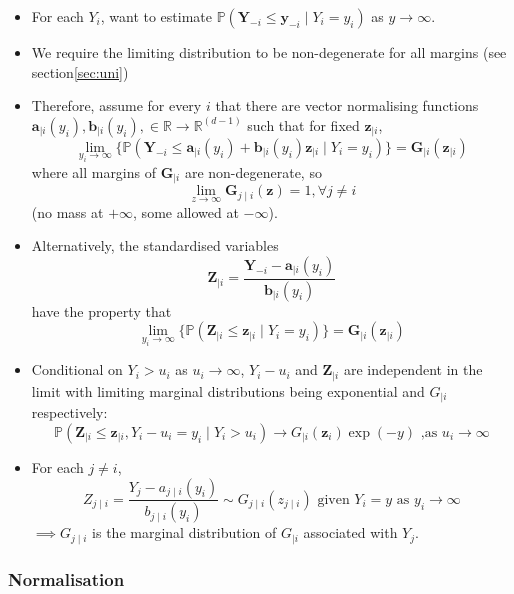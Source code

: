 \documentclass{article}
\numberwithin{equation}{section}
\begin{document}
\begin{itemize}
  \item For each $Y_i$, want to estimate $\mathbb{P}(\bm{Y}_{-i} \le \bm{y}_{-i} \mid Y_i = y_i)$ as $y \rightarrow \infty$. 
  \item We require the limiting distribution to be non-degenerate for all margins (see section\ref{sec:uni})
  \item Therefore, assume for every $i$ that there are vector normalising functions $\bm{a}_{\mid i}(y_i),\bm{b}_{\mid i}(y_i), \in \mathbb{R} \rightarrow \mathbb{R}^{(d-1)}$ such that for fixed $\bm{z}_{\mid i}$, 
    \[
      \lim_{y_i \rightarrow \infty}\{\mathbb{P}(\bm{Y}_{-i} \le \bm{a}_{\mid i}(y_i) + \bm{b}_{\mid i}(y_i)\bm{z}_{\mid i} \mid Y_i = y_i)\} = \bm{G}_{\mid i}(\bm{z}_{\mid i})
    \] 
    where all margins of $\bm{G}_{\mid i}$ are non-degenerate, so 
    \[
    \lim_{z \rightarrow \infty}{\bm{G}_{j \mid i}(\bm{z})} = 1, \forall j \ne i
    \] (no mass at $+\infty$, some allowed at $-\infty$).
  \item Alternatively, the standardised variables
    \[
      \bm{Z}_{\mid i} = \frac{\bm{Y}_{-i} - \bm{a}_{\mid i}(y_i)} {\bm{b}_{\mid i}(y_i)}
    \]
    have the property that 
    \[
      \lim_{y_i \rightarrow \infty}\{\mathbb{P}(\bm{Z}_{\mid i} \le \bm{z}_{\mid i} \mid Y_i = y_i)\} = \bm{G}_{\mid i}(\bm{z}_{\mid i})
    \]
  \item Conditional on $Y_i > u_i$ as $u_i \rightarrow \infty$, $Y_i  - u_i$ and $\bm{Z}_{\mid i}$ are independent in the limit with limiting marginal distributions being exponential and $G_{\mid i}$ respectively:
    \[
      \mathbb{P}(\bm{Z}_{\mid i} \le \bm{z}_{\mid i}, Y_i - u_i = y_i \mid Y_i > u_i) \rightarrow G_{\mid i}(\bm{z}_i) \exp(-y) \text{ ,as } u_i \rightarrow \infty
    \]
  \item For each $j \ne i$, 
    \[
      Z_{j\mid i} = \frac{Y_j - a_{j\mid i}(y_i)}{b_{j\mid i}(y_i)} \sim G_{j\mid i}(z_{j\mid i}) \text { given } Y_i = y \text{ as } y_i \rightarrow \infty
    \]
    $\implies G_{j \mid i}$ is the marginal distribution of $G_{\mid i}$ associated with $Y_j$.
\end{itemize}

\subsubsection{Normalisation} \label{subsubsec:norm}
\end{document}
